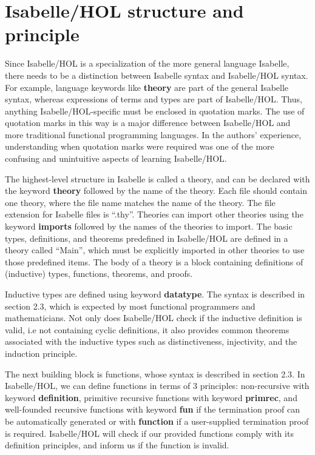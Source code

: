 \documentclass{article}
\begin{document}
\section{Isabelle/HOL structure and principle}

Since Isabelle/HOL is a specialization of the more general language Isabelle,
there needs to be a distinction between Isabelle syntax and Isabelle/HOL
syntax. For example, language keywords like \textbf{theory} are part of the
general Isabelle syntax, whereas expressions of terms and types are part of
Isabelle/HOL. Thus, anything Isabelle/HOL-specific must be enclosed in
quotation marks. The use of quotation marks in this way is a major difference
between Isabelle/HOL and more traditional functional programming languages. In
the authors' experience, understanding when quotation marks were required was
one of the more confusing and unintuitive aspects of learning Isabelle/HOL.

The highest-level structure in Isabelle is called a theory, and can be declared 
with the keyword \textbf{theory} followed by the name of the theory. Each file 
should contain one theory, where the file name matches the name of the theory. 
The file extension for Isabelle files is ``.thy''. Theories can import other 
theories using the keyword \textbf{imports} followed by the names of the 
theories to import. The basic types, definitions, and theorems predefined in 
Isabelle/HOL are defined in a theory called ``Main'', which must be explicitly 
imported in other theories to use those predefined items. The body of a theory 
is a block containing definitions of (inductive) types, functions, theorems, and proofs.

Inductive types are defined using keyword \textbf{datatype}.
The syntax is described in \cite{IsabelleTutorial} section 2.3,
which is expected by most functional programmers and mathematicians.
Not only does Isabelle/HOL check if the inductive definition is valid, i.e not 
containing cyclic definitions,
it also provides common theorems associated with the inductive types such as 
distinctiveness, injectivity, and the induction principle.

The next building block is functions, whose syntax is described in \cite{IsabelleTutorial} section 2.3.
In Isabelle/HOL, we can define functions in terms of 3 principles: 
non-recursive with keyword \textbf{definition}, primitive recursive functions 
with keyword \textbf{primrec}, and
well-founded recursive functions with keyword \textbf{fun} if the termination 
proof can be automatically generated or with \textbf{function} if a 
user-supplied termination proof is required.
Isabelle/HOL will check if our provided functions comply with its definition 
principles, and inform us if the function is invalid.
\end{document}
